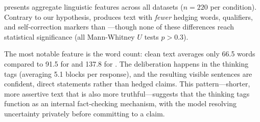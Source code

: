  presents aggregate linguistic features across all datasets ($n{=}220$ per condition). Contrary to our hypothesis, \sentthink produces text with \emph{fewer} hedging words, qualifiers, and self-correction markers than \direct---though none of these differences reach statistical significance (all Mann-Whitney $U$ tests $p{>}0.3$).

\begin{table}[t]
    \centering
    \caption{Linguistic features aggregated across all datasets ($n{=}220$ per condition). \sentthink produces shorter, more concise text with fewer hedging markers. No differences are statistically significant (all $p{>}0.3$).}
    \label{tab:linguistic}
\end{table}

The most notable feature is the word count: \sentthink clean text averages only 66.5 words compared to 91.5 for \direct and 137.8 for \stdcot. The deliberation happens in the thinking tags (averaging 5.1 blocks per response), and the resulting visible sentences are confident, direct statements rather than hedged claims. This pattern---shorter, more assertive text that is also more truthful---suggests that the thinking tags function as an internal fact-checking mechanism, with the model resolving uncertainty privately before committing to a claim.
